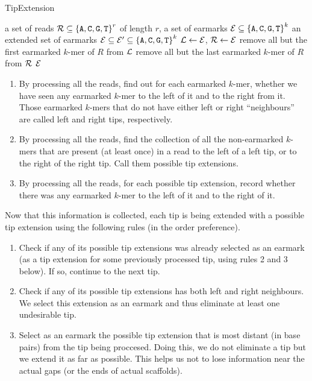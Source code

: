 \documentclass[12pt]{article}
\def\acgt{\{{\tt A,C,G,T}\}}
\begin{document}
\begin{algorithm}
\caption{TipExtension}
\label{alg:tipextension}
\begin{algorithmic}%
  \REQUIRE a set of reads ${\cal R} \subseteq {\acgt}^r$ of length $r$, 
    a set of earmarks ${\cal E} \subseteq {\acgt}^k$
  \ENSURE an extended set of earmarks ${\cal E} \subseteq {\cal E'} \subseteq {\acgt}^k$
  \STATE ${\cal L} \gets {\cal E}$, ${\cal R} \gets {\cal E}$ 
    \STATE remove all but the first earmarked $k$-mer of $R$ from ${\cal L}$
    \STATE remove all but the last earmarked $k$-mer of $R$ from ${\cal R}$
  \ENDFOR
  \RETURN ${\cal E}$
\end{algorithmic}
\end{algorithm}


\begin{enumerate}
\item By processing all the reads, find out for each earmarked $k$-mer, whether we have seen any
earmarked $k$-mer to the left of it and to the right from it.
Those earmarked $k$-mers that do not have either left or right ``neighbours'' are called left and right tips,
respectively.
\item By processing all the reads, find the collection of all the non-earmarked $k$-mers that
are present (at least once) in a read to the left of a left tip, or to the right of the right tip.
Call them possible tip extensions.
\item By processing all the reads, for each possible tip extension, record whether there was
any earmarked $k$-mer to the left of it and to the right of it.
\end{enumerate}

Now that this information is collected, each tip is being extended with
a possible tip extension using the following rules (in the order preference).

\begin{enumerate}
\item Check if any of its possible tip extensions was already selected as an earmark
(as a tip extension for some previously processed tip, using rules 2 and 3 below).
If so, continue to the next tip.
\item Check if any of its possible tip extensions has both left and right neighbours.
We select this extension as an earmark and thus eliminate at least one undesirable tip.
\item Select as an earmark the possible tip extension that is most distant (in base pairs)
from the tip being proccesed. Doing this, we do not eliminate a tip but we extend it as far
as possible. This helps us not to lose information near the actual gaps (or the ends of actual scaffolds).
\end{enumerate}
\end{document}
